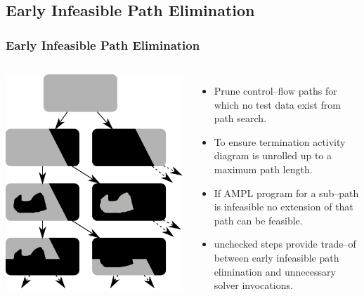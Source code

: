 \documentclass{beamer}
\begin{document}
\subsection{Early Infeasible Path Elimination}
\begin{frame}
\frametitle{Early Infeasible Path Elimination}
	\begin{columns}[c]
			\includegraphics[width=\textwidth]{./pics/VennTree.pdf}
				\begin{itemize}
\item Prune control--flow paths for which no test data exist from path
search.
\item To ensure termination activity diagram is unrolled up to a maximum path
length.
\item If AMPL program for a sub--path is infeasible no extension of that
path can be feasible.
\item unchecked steps provide trade--of between early infeasible path
elimination and unnecessary solver invocations.
				\end{itemize}
	\end{columns}
\end{frame}
\end{document}
